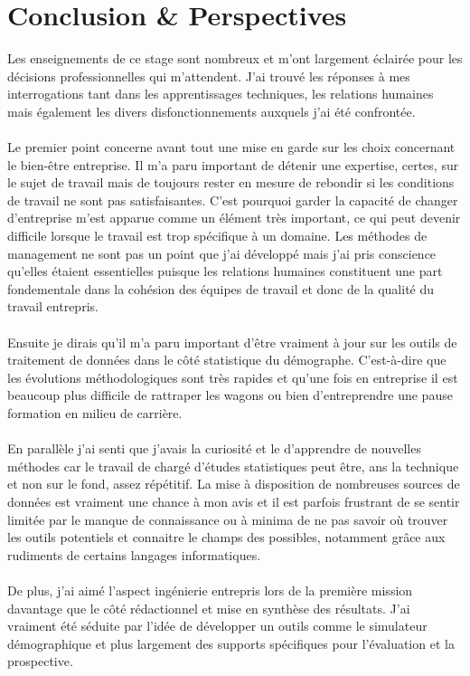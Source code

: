 \documentclass{bredele}
\begin{document}
\chapter{Conclusion \& Perspectives}
Les enseignements de ce stage sont nombreux et m’ont largement éclairée pour les décisions professionnelles qui m’attendent. J’ai trouvé les réponses à mes interrogations tant dans les apprentissages techniques, les relations humaines mais également les divers disfonctionnements auxquels j’ai été confrontée.
\\\\Le premier point concerne avant tout une mise en garde sur les choix concernant le bien-être entreprise. Il m'a paru important de détenir une expertise, certes, sur le sujet de travail mais de toujours rester en mesure de rebondir si les conditions de travail ne sont pas satisfaisantes. C'est pourquoi garder la capacité de changer d'entreprise m'est apparue comme un élément très important, ce qui peut devenir difficile lorsque le travail est trop spécifique à un domaine.
Les méthodes de management ne sont pas un point que j'ai développé mais j'ai pris conscience qu'elles étaient essentielles puisque les relations humaines constituent une part fondementale dans la cohésion des équipes de travail et donc de la qualité du travail entrepris. 
\\\\Ensuite je dirais qu’il m’a paru important d’être vraiment à jour sur les outils de traitement de données dans le côté statistique du démographe. C'est-à-dire que les évolutions méthodologiques sont très rapides et qu’une fois en entreprise il est beaucoup plus difficile de rattraper les wagons ou bien d’entreprendre une pause formation en milieu de carrière.
\\\\En parallèle j’ai senti que j’avais la curiosité et le d’apprendre de nouvelles méthodes car le travail de chargé d’études statistiques peut être, ans la technique et non sur le fond, assez répétitif. La mise à disposition de nombreuses sources de données est vraiment une chance à mon avis et il est parfois frustrant de se sentir limitée par le manque de connaissance ou à minima de ne pas savoir où trouver les outils potentiels et connaitre le champs des possibles, notamment grâce aux rudiments de certains langages informatiques.
\\\\De plus, j’ai aimé l’aspect ingénierie entrepris lors de la première mission davantage que le côté rédactionnel et mise en synthèse des résultats. J’ai vraiment été séduite par l’idée de développer un outils comme le simulateur démographique et plus largement des supports spécifiques pour l'évaluation et la prospective.
\end{document}
